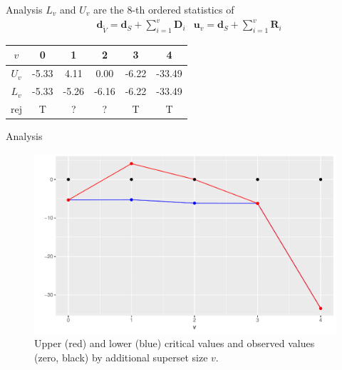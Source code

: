 \documentclass[aspectratio=169]{beamer}
\begin{document}
\begin{frame}{Analysis}
$L_v$ and $U_v$ are the 8-th ordered statistics of
\begin{align*}
& \mathbf{d}_{\tilde{V}}=\mathbf{d}_S + \sum_{i=1}^v \mathbf{D}_i & \mathbf{u}_v=\mathbf{d}_S + \sum_{i=1}^v \mathbf{R}_i
\end{align*}

\vspace{3mm}
\begin{table}[h!]
\centering
\begin{tabular}{cccccc}
\toprule
$v$ & 0 & 1 & 2 & 3 & 4\\
\midrule
$U_v$ & -5.33 & 4.11 & 0.00 & -6.22 & -33.49\\
$L_v$ & -5.33 & -5.26 & -6.16 & -6.22 & -33.49\\
\midrule
rej & T & ? & ? & T & T\\
\bottomrule
\end{tabular}
\end{table}
\end{frame}




\begin{frame}{Analysis}
\begin{figure}
\includegraphics[scale=0.5]{plot1.pdf}
\caption{Upper (red) and lower (blue) critical values and observed values (zero, black) by additional superset size $v$.}
\end{figure}
\end{frame}


\end{document}
